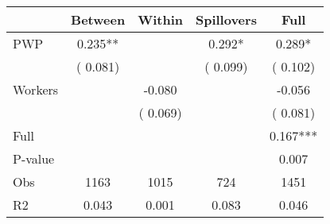 
\begin{tabular}{l*{4}{c}}\hline&\multicolumn{1}{c}{Between}&\multicolumn{1}{c}{Within}&\multicolumn{1}{c}{Spillovers}&\multicolumn{1}{c}{Full}\\ \hline
 PWP           &              0.235**      &                                               &        0.292* &         0.289*                            \\ 
                               &        (       0.081)           &                                       &       (       0.099)     &      (       0.102)                                           \\ 
 Workers       &                                               &       -0.080    &                                &            -0.056                            \\ 
                               &                                               & (       0.069)                  &                                        &      (       0.081)                                           \\ 
\hline                                                                                                                                                                                                                                            
 Full                  &                                               &                                               &                                        &             0.167***                                     \\ 
 P-value               &                                               &                                               &                                        &             0.007                                           \\ 
 Obs                   &               1163               &       1015                       &       724                &              1451                                               \\ 
 R2                    &                      0.043              &              0.001                      &              0.083               &                     0.046                                              \\ 
\hline \end{tabular}                                                                                                                                                                                                              